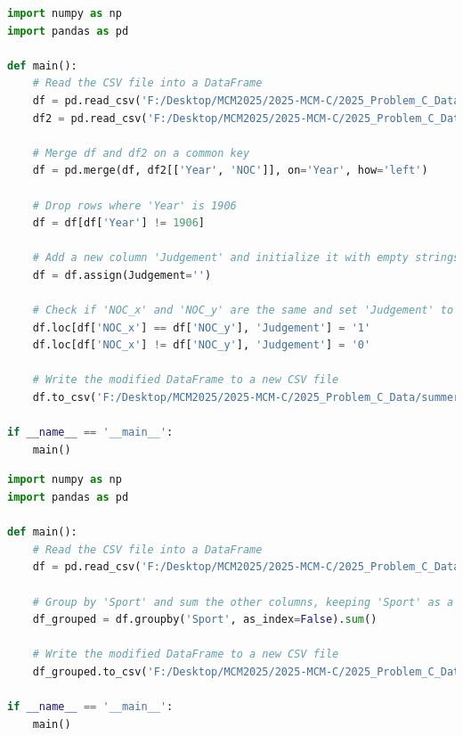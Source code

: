 \documentclass[12pt]{article}
\begin{document}
\begin{lstlisting}[language=Python, style=mystyle, caption=data\_process\_athelets.py]
import numpy as np
import pandas as pd

def main():
    # Read the CSV file into a DataFrame
    df = pd.read_csv('F:/Desktop/MCM2025/2025-MCM-C/2025_Problem_C_Data/summerOly_athletes.csv')
    df2 = pd.read_csv('F:/Desktop/MCM2025/2025-MCM-C/2025_Problem_C_Data/summerOly_hosts_completed.csv')

    # Merge df and df2 on a common key 
    df = pd.merge(df, df2[['Year', 'NOC']], on='Year', how='left')

    # Drop rows where 'Year' is 1906
    df = df[df['Year'] != 1906]
    
    # Add a new column 'Judgement' and initialize it with empty strings
    df = df.assign(Judgement='')

    # Check if 'NOC_x' and 'NOC_y' are the same and set 'Judgement' to '1' if they are, otherwise set it to '0'
    df.loc[df['NOC_x'] == df['NOC_y'], 'Judgement'] = '1'
    df.loc[df['NOC_x'] != df['NOC_y'], 'Judgement'] = '0'

    # Write the modified DataFrame to a new CSV file
    df.to_csv('F:/Desktop/MCM2025/2025-MCM-C/2025_Problem_C_Data/summerOly_athletes_completed.csv', index=False, encoding='utf-8')

if __name__ == '__main__':
    main()
\end{lstlisting}

\begin{lstlisting}[language=Python, style=mystyle, caption=data\_process\_program\_plot.py]
import numpy as np
import pandas as pd

def main():
    # Read the CSV file into a DataFrame
    df = pd.read_csv('F:/Desktop/MCM2025/2025-MCM-C/2025_Problem_C_Data/program_plot.csv')

    # Group by 'Sport' and sum the other columns, keeping 'Sport' as a column
    df_grouped = df.groupby('Sport', as_index=False).sum()

    # Write the modified DataFrame to a new CSV file
    df_grouped.to_csv('F:/Desktop/MCM2025/2025-MCM-C/2025_Problem_C_Data/program_plot_end.csv', index=False, encoding='utf-8')

if __name__ == '__main__':
    main()
\end{lstlisting}
\end{document}
